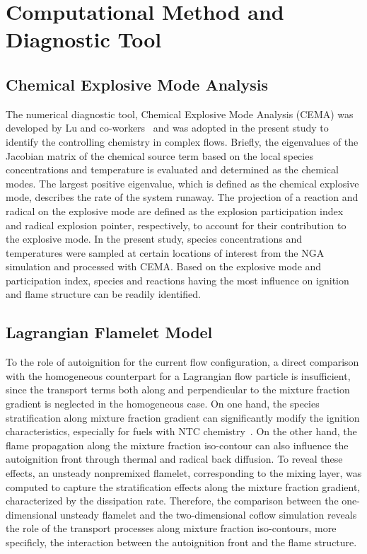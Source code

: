 \documentclass[review,3p,times]{elsarticleUS}
\begin{document}
\section{Computational Method and Diagnostic Tool}
\subsection{Chemical Explosive Mode Analysis}

The numerical diagnostic tool, Chemical Explosive Mode Analysis (CEMA) was developed by Lu and co-workers~\cite{lu10,ruiqin12} and was adopted in the present study to identify the controlling chemistry in complex flows.  Briefly, the eigenvalues of the Jacobian matrix of the chemical source term based on the local species concentrations and temperature is evaluated and determined as the chemical modes.  The largest positive eigenvalue, which is defined as the chemical explosive mode, describes the rate of the system runaway.  The projection of a reaction and radical on the explosive mode are defined as the explosion participation index and radical explosion pointer, respectively, to account for their contribution to the explosive mode.  In the present study, species concentrations and temperatures were sampled at certain locations of interest from the NGA simulation and processed with CEMA.  Based on the explosive mode and participation index, species and reactions having the most influence on ignition and flame structure can be readily identified.

\subsection{Lagrangian Flamelet Model} \label{sec:LFM}

To the role of autoignition for the current flow configuration, a direct comparison with the homogeneous counterpart for a Lagrangian flow particle is insufficient, since the transport terms both along and perpendicular to the mixture fraction gradient is neglected in the homogeneous case.  On one hand, the species stratification along mixture fraction gradient can significantly modify the ignition characteristics, especially for fuels with NTC chemistry~\cite{law12,deng14}.  On the other hand, the flame propagation along the mixture fraction iso-contour can also influence the autoignition front through thermal and radical back diffusion.  To reveal these effects, an unsteady nonpremixed flamelet, corresponding to the mixing layer,  was computed to capture the stratification effects along the mixture fraction gradient, characterized by the dissipation rate.  Therefore, the comparison between the one-dimensional unsteady flamelet and the two-dimensional coflow simulation reveals the role of the transport processes along mixture fraction iso-contours, more specificly, the interaction between the autoignition front and the flame structure.  
\end{document}

